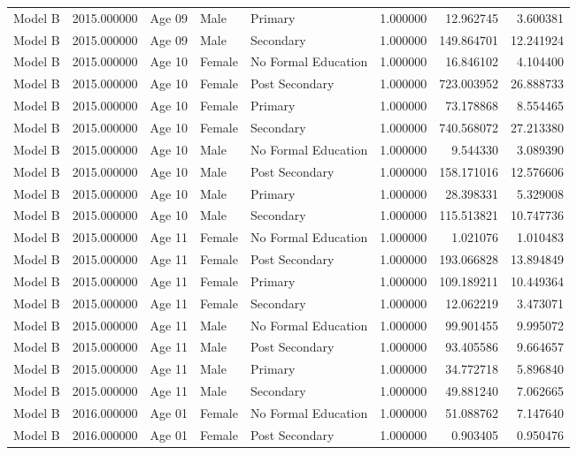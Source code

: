 \begin{table}[ht]
\begin{tabular}{lrlllrrr}
Model B & 2015.000000 & Age 09 & Male & Primary & 1.000000 & 12.962745 & 3.600381 \\
Model B & 2015.000000 & Age 09 & Male & Secondary & 1.000000 & 149.864701 & 12.241924 \\
Model B & 2015.000000 & Age 10 & Female & No Formal Education & 1.000000 & 16.846102 & 4.104400 \\
Model B & 2015.000000 & Age 10 & Female & Post Secondary & 1.000000 & 723.003952 & 26.888733 \\
Model B & 2015.000000 & Age 10 & Female & Primary & 1.000000 & 73.178868 & 8.554465 \\
Model B & 2015.000000 & Age 10 & Female & Secondary & 1.000000 & 740.568072 & 27.213380 \\
Model B & 2015.000000 & Age 10 & Male & No Formal Education & 1.000000 & 9.544330 & 3.089390 \\
Model B & 2015.000000 & Age 10 & Male & Post Secondary & 1.000000 & 158.171016 & 12.576606 \\
Model B & 2015.000000 & Age 10 & Male & Primary & 1.000000 & 28.398331 & 5.329008 \\
Model B & 2015.000000 & Age 10 & Male & Secondary & 1.000000 & 115.513821 & 10.747736 \\
Model B & 2015.000000 & Age 11 & Female & No Formal Education & 1.000000 & 1.021076 & 1.010483 \\
Model B & 2015.000000 & Age 11 & Female & Post Secondary & 1.000000 & 193.066828 & 13.894849 \\
Model B & 2015.000000 & Age 11 & Female & Primary & 1.000000 & 109.189211 & 10.449364 \\
Model B & 2015.000000 & Age 11 & Female & Secondary & 1.000000 & 12.062219 & 3.473071 \\
Model B & 2015.000000 & Age 11 & Male & No Formal Education & 1.000000 & 99.901455 & 9.995072 \\
Model B & 2015.000000 & Age 11 & Male & Post Secondary & 1.000000 & 93.405586 & 9.664657 \\
Model B & 2015.000000 & Age 11 & Male & Primary & 1.000000 & 34.772718 & 5.896840 \\
Model B & 2015.000000 & Age 11 & Male & Secondary & 1.000000 & 49.881240 & 7.062665 \\
Model B & 2016.000000 & Age 01 & Female & No Formal Education & 1.000000 & 51.088762 & 7.147640 \\
Model B & 2016.000000 & Age 01 & Female & Post Secondary & 1.000000 & 0.903405 & 0.950476 \\

\end{tabular}
\end{table}
